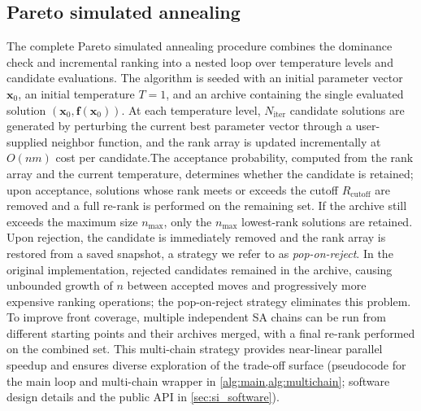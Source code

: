\documentclass[12pt]{article}
\begin{document}
\subsection{Pareto simulated annealing}\label{sec:annealing}
The complete Pareto simulated annealing procedure combines the dominance check and incremental ranking into a nested loop over temperature levels and candidate evaluations. The algorithm is seeded with an initial parameter vector $\mathbf{x}_0$, an initial temperature $T = 1$, and an archive containing the single evaluated solution $(\mathbf{x}_0, \mathbf{f}(\mathbf{x}_0))$. At each temperature level, $N_{\text{iter}}$ candidate solutions are generated by perturbing the current best parameter vector through a user-supplied neighbor function, and the rank array is updated incrementally at $O(nm)$ cost per candidate.The acceptance probability, computed from the rank array and the current temperature, determines whether the candidate is retained; upon acceptance, solutions whose rank meets or exceeds the cutoff $R_{\text{cutoff}}$ are removed and a full re-rank is performed on the remaining set. If the archive still exceeds the maximum size $n_{\max}$, only the $n_{\max}$ lowest-rank solutions are retained. Upon rejection, the candidate is immediately removed and the rank array is restored from a saved snapshot, a strategy we refer to as \emph{pop-on-reject}. In the original implementation, rejected candidates remained in the archive, causing unbounded growth of $n$ between accepted moves and progressively more expensive ranking operations; the pop-on-reject strategy eliminates this problem. To improve front coverage, multiple independent SA chains can be run from different starting points and their archives merged, with a final re-rank performed on the combined set. This multi-chain strategy provides near-linear parallel speedup and ensures diverse exploration of the trade-off surface (pseudocode for the main loop and multi-chain wrapper in \cref{alg:main,alg:multichain}; software design details and the public API in \cref{sec:si_software}).

\end{document}
